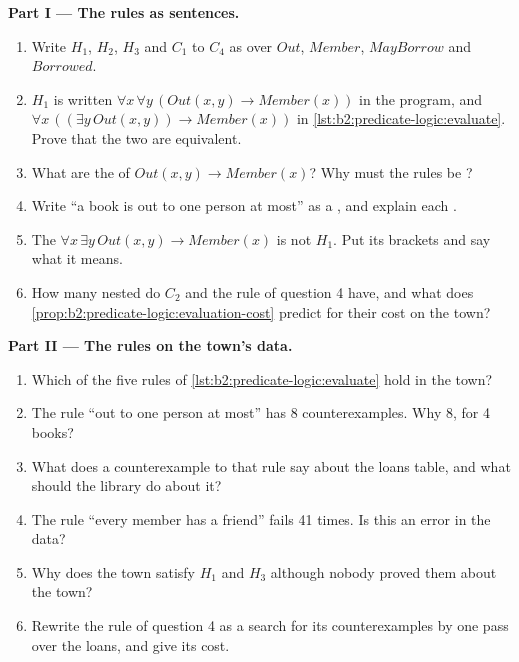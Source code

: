 \begin{problem}
\medskip\noindent\textbf{Part I --- The rules as sentences.}\par\nopagebreak
\begin{enumerate}
\item Write $H_1$, $H_2$, $H_3$ and $C_1$ to $C_4$ as  over $\mathit{Out}$, $\mathit{Member}$,
$\mathit{MayBorrow}$ and $\mathit{Borrowed}$.
\item $H_1$ is written $\forall x\, \forall y\, (\mathit{Out}(x, y) \to \mathit{Member}(x))$ in the program, and
$\forall x\, ((\exists y\, \mathit{Out}(x, y)) \to \mathit{Member}(x))$ in \cref{lst:b2:predicate-logic:evaluate}. Prove
that the two are equivalent.
\item What are the  of $\mathit{Out}(x, y) \to \mathit{Member}(x)$? Why must the rules be ?
\item Write ``a book is out to one person at most'' as a , and explain each .
\item The  $\forall x\, \exists y\, \mathit{Out}(x, y) \to \mathit{Member}(x)$ is not $H_1$. Put its brackets and
say what it means.
\item How many nested  do $C_2$ and the rule of question 4 have, and what does
\cref{prop:b2:predicate-logic:evaluation-cost} predict for their cost on the town?
\end{enumerate}

\medskip\noindent\textbf{Part II --- The rules on the town's data.}\par\nopagebreak
\begin{enumerate}[resume, beginpenalty=10000]
\item Which of the five rules of \cref{lst:b2:predicate-logic:evaluate} hold in the town?
\item The rule ``out to one person at most'' has 8 counterexamples. Why 8, for 4 books?
\item What does a counterexample to that rule say about the loans table, and what should the library do about it?
\item The rule ``every member has a friend'' fails 41 times. Is this an error in the data?
\item Why does the town satisfy $H_1$ and $H_3$ although nobody proved them about the town?
\item Rewrite the rule of question 4 as a search for its counterexamples by one pass over the loans, and give its cost.
\end{enumerate}


\end{problem}
